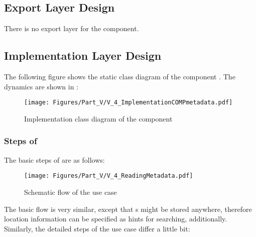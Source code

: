 \subsection{Export Layer Design}
\label{sec:ExportDesignCOMPmetadata}

There is no export layer for the \COMPmetadata{} component.


\subsection{Implementation Layer Design}
\label{sec:ImplementationDesignCOMPmetadata}

The following figure shows the static class diagram of the component \COMPmetadata{}. The dynamics are shown in :

\begin{figure}[H]
	\centering
	\texttt{[image: Figures/Part\_V/V\_4\_ImplementationCOMPmetadata.pdf]}
	\caption{Implementation class diagram of the component \COMPmetadata{}}
	\label{fig:V_4_ImplementationCOMPmetadata}
\end{figure}



\subsubsection{Steps of \UCreadMetadata{}}
\label{sec:StepsOfUCreadMetadata}

The basic steps of \UCreadMetadata{} are as follows:

\begin{figure}[H]
	\centering
	\texttt{[image: Figures/Part\_V/V\_4\_ReadingMetadata.pdf]}
	\caption{Schematic flow of the use case \UCreadMetadata{}}
	\label{fig:V_4_ReadingMetadata.pdf}
\end{figure}

The basic flow is very similar, except that \TERMtag{}s might be stored anywhere, therefore location information can be specified as hints for searching, additionally. Similarly, the detailed steps of the use case differ a little bit:

